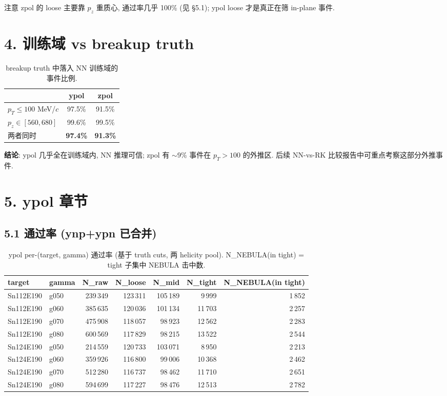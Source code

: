 \documentclass[a4paper,11pt]{article}
\begin{document}
注意 zpol 的 loose 主要靠 $p_z$ 重质心, 通过率几乎 100\% (见 §5.1); ypol loose 才是真正在筛 in-plane 事件.

\section{4. 训练域 vs breakup truth}

\begin{table}[H]
\centering\footnotesize
\caption{breakup truth 中落入 NN 训练域的事件比例.}
\begin{tabular}{lcc}
\toprule
                         & ypol & zpol \\
\midrule
$p_T \le 100$ MeV/$c$    & 97.5\% & 91.5\% \\
$p_z \in [560, 680]$     & 99.6\% & 99.5\% \\
两者同时                  & \textbf{97.4\%} & \textbf{91.3\%} \\
\bottomrule
\end{tabular}
\end{table}

\textbf{结论}: ypol 几乎全在训练域内, NN 推理可信; zpol 有 $\sim$9\% 事件在 $p_T > 100$ 的外推区. 后续 NN-vs-RK 比较报告中可重点考察这部分外推事件.

\section{5. ypol 章节}

\subsection{5.1 通过率 (ynp+ypn 已合并)}

\begin{table}[H]
\centering\footnotesize
\caption{ypol per-(target, gamma) 通过率 (基于 truth cuts, 两 helicity pool). N\_NEBULA(in tight) = tight 子集中 NEBULA 击中数.}
\begin{tabular}{llrrrrr}
\toprule
target & gamma & N\_raw & N\_loose & N\_mid & N\_tight & N\_NEBULA(in tight) \\
\midrule
Sn112E190 & g050 & 239\,349 & 123\,311 & 105\,189 &  9\,999 & 1\,852 \\
Sn112E190 & g060 & 385\,635 & 120\,036 & 101\,134 & 11\,703 & 2\,257 \\
Sn112E190 & g070 & 475\,908 & 118\,057 &  98\,923 & 12\,562 & 2\,283 \\
Sn112E190 & g080 & 600\,569 & 117\,829 &  98\,215 & 13\,522 & 2\,544 \\
Sn124E190 & g050 & 214\,559 & 120\,733 & 103\,071 &  8\,950 & 2\,213 \\
Sn124E190 & g060 & 359\,926 & 116\,800 &  99\,006 & 10\,368 & 2\,462 \\
Sn124E190 & g070 & 512\,280 & 116\,737 &  98\,462 & 11\,710 & 2\,651 \\
Sn124E190 & g080 & 594\,699 & 117\,227 &  98\,476 & 12\,513 & 2\,782 \\
\bottomrule
\end{tabular}
\end{table}
\end{document}
